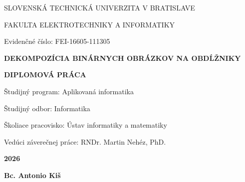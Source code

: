 \begin{titlepage}
    \centering
    {\Large\textbf{}{SLOVENSKÁ TECHNICKÁ UNIVERZITA V BRATISLAVE \par
    FAKULTA ELEKTROTECHNIKY A INFORMATIKY \par}}
    \vspace{2cm} %
    \begin{flushleft}
        Evidenčné číslo: FEI-16605-111305
    \end{flushleft}
    \vspace{5cm}
    {\Large\textbf {DEKOMPOZÍCIA BINÁRNYCH OBRÁZKOV NA OBDĹŽNIKY}\par}
    \vspace{1cm}
    {\large\textbf{DIPLOMOVÁ PRÁCA}}
    \vspace{3cm}

    \raggedright
    Študijný program: Aplikovaná informatika

    \vspace{0.3cm}

    Študijný odbor: Informatika

    \vspace{0.3cm}

    Školiace pracovisko: Ústav informatiky a matematiky

    \vspace{0.3cm}

    Vedúci záverečnej práce: RNDr. Martin Nehéz, PhD.

    \vfill

    \begin{minipage}[t]{0.5\textwidth}
        \raggedright
        \normalsize{\textbf{2026}}
    \end{minipage}%
    \begin{minipage}[t]{0.5\textwidth}
        \raggedleft
        \normalsize{\textbf{Bc. Antonio Kiš}}
    \end{minipage}
\end{titlepage}